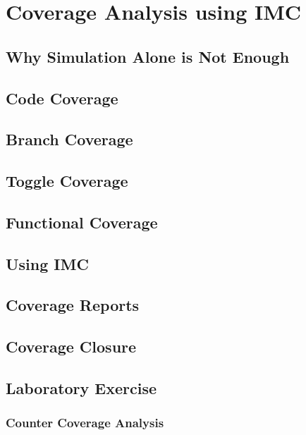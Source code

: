 \chapter{Coverage Analysis using IMC}

\section{Why Simulation Alone is Not Enough}

\section{Code Coverage}

\section{Branch Coverage}

\section{Toggle Coverage}

\section{Functional Coverage}

\section{Using IMC}

\section{Coverage Reports}

\section{Coverage Closure}

\section{Laboratory Exercise}

\subsection*{Counter Coverage Analysis}

